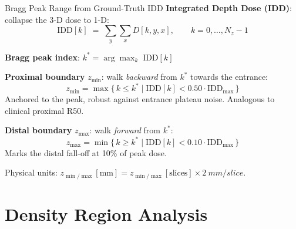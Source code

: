 \documentclass[aspectratio=169, 10pt]{beamer}
\begin{document}
\begin{frame}{Bragg Peak Range from Ground-Truth IDD}
  \textbf{Integrated Depth Dose (IDD)}: collapse the 3-D dose to 1-D:
  \begin{equation*}
    \text{IDD}[k] \;=\; \sum_{y}\sum_{x} D[k, y, x], \qquad k = 0, \ldots, N_z - 1
  \end{equation*}

  \textbf{Bragg peak index}: $k^* = \arg\max_k \;\text{IDD}[k]$

  \vspace{6pt}
  \textbf{Proximal boundary} $z_{\min}$: walk \emph{backward} from $k^*$
  towards the entrance:
  \begin{equation*}
    z_{\min} = \max\bigl\{\, k \leq k^* \;\big|\;
    \text{IDD}[k] < 0.50 \cdot \text{IDD}_{\max} \,\bigr\}
  \end{equation*}
  {\small Anchored to the peak, robust against entrance plateau noise.
  Analogous to clinical proximal R50.}

  \vspace{6pt}
  \textbf{Distal boundary} $z_{\max}$: walk \emph{forward} from $k^*$:
  \begin{equation*}
    z_{\max} = \min\bigl\{\, k \geq k^* \;\big|\;
    \text{IDD}[k] < 0.10 \cdot \text{IDD}_{\max} \,\bigr\}
  \end{equation*}
  {\small Marks the distal fall-off at 10\% of peak dose.}

  \vspace{4pt}
  Physical units: $z_{\min/\max}[\text{mm}] = z_{\min/\max}[\text{slices}]
  \times \SI{2}{mm/slice}$.
\end{frame}

\section{Density Region Analysis}
\end{document}
